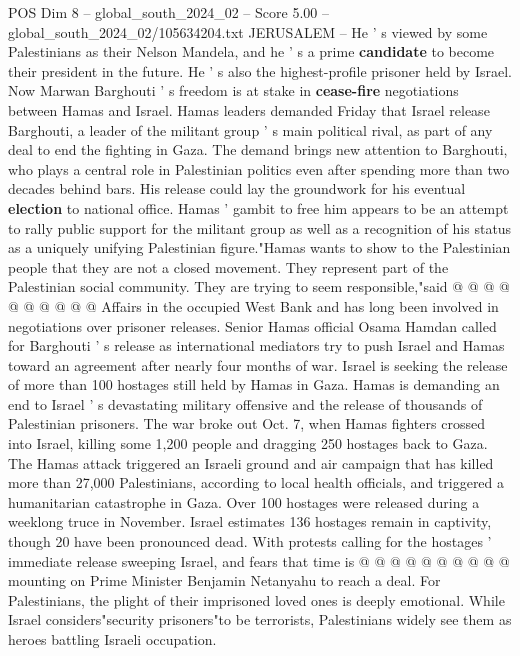 \begin{textsample}{POS Dim 8 – global\_south\_2024\_02 – Score 5.00 – global\_south\_2024\_02/105634204.txt}  \label{ex:f8_pos_205}
JERUSALEM -- He ' s viewed by some Palestinians as their Nelson Mandela, and he ' s a prime \textbf{candidate} to become their president in the future.
He ' s also the highest-profile prisoner held by Israel.
Now Marwan Barghouti ' s freedom is at stake in \textbf{cease-fire} negotiations between Hamas and Israel.
Hamas leaders demanded Friday that Israel release Barghouti, a leader of the militant group ' s main political rival, as part of any deal to end the fighting in Gaza.
The demand brings new attention to Barghouti, who plays a central role in Palestinian politics even after spending more than two decades behind bars.
His release could lay the groundwork for his eventual \textbf{election} to national office.
Hamas ' gambit to free him appears to be an attempt to rally public support for the militant group as well as a recognition of his status as a uniquely unifying Palestinian figure."Hamas wants to show to the Palestinian people that they are not a closed movement.
They represent part of the Palestinian social community.
They are trying to seem responsible,"said @ @ @ @ @ @ @ @ @ @ Affairs in the occupied West Bank and has long been involved in negotiations over prisoner releases.
Senior Hamas official Osama Hamdan called for Barghouti ' s release as international mediators try to push Israel and Hamas toward an agreement after nearly four months of war.
Israel is seeking the release of more than 100 hostages still held by Hamas in Gaza.
Hamas is demanding an end to Israel ' s devastating military offensive and the release of thousands of Palestinian prisoners.
The war broke out Oct. 7, when Hamas fighters crossed into Israel, killing some 1,200 people and dragging 250 hostages back to Gaza.
The Hamas attack triggered an Israeli ground and air campaign that has killed more than 27,000 Palestinians, according to local health officials, and triggered a humanitarian catastrophe in Gaza.
Over 100 hostages were released during a weeklong truce in November.
Israel estimates 136 hostages remain in captivity, though 20 have been pronounced dead.
With protests calling for the hostages ' immediate release sweeping Israel, and fears that time is @ @ @ @ @ @ @ @ @ @ mounting on Prime Minister Benjamin Netanyahu to reach a deal.
For Palestinians, the plight of their imprisoned loved ones is deeply emotional.
While Israel considers"security prisoners"to be terrorists, Palestinians widely see them as heroes battling Israeli occupation.

\end{textsample}
